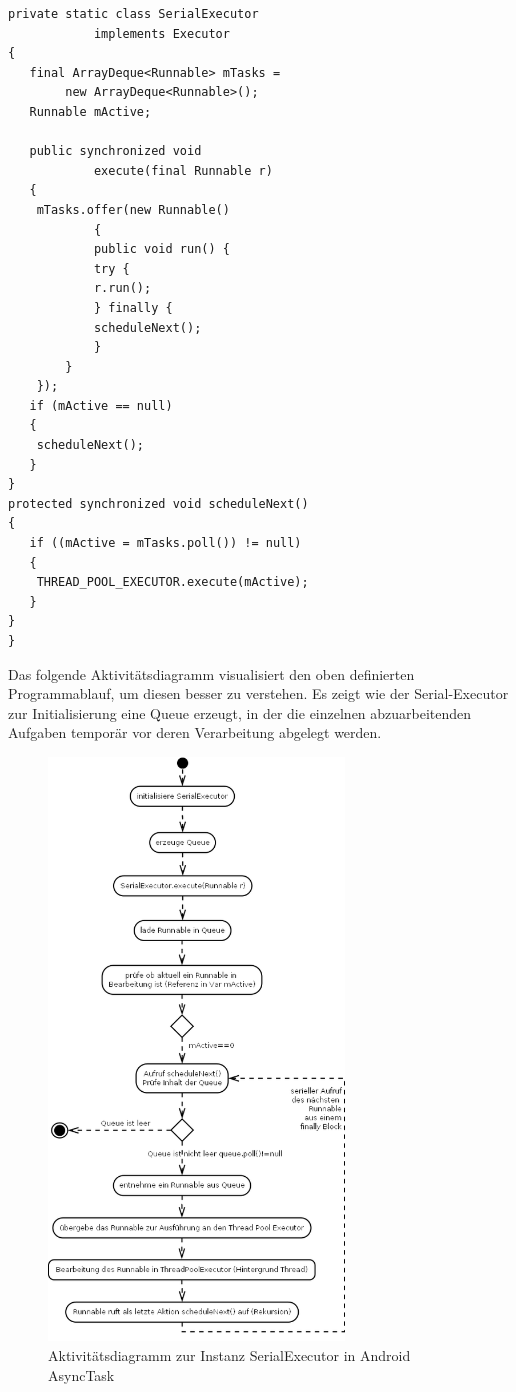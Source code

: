\documentclass[12pt,oneside,a4paper,bibtotoc,liststotoc]{scrreprt}
\begin{document}
\begin{lstlisting}
private static class SerialExecutor 
			implements Executor 
{
   final ArrayDeque<Runnable> mTasks = 
   		new ArrayDeque<Runnable>();
   Runnable mActive;

   public synchronized void 
   			execute(final Runnable r) 
   {
    mTasks.offer(new Runnable() 
    		{
   			public void run() {
			try {
			r.run();
			} finally {
			scheduleNext();
   			}
   		}
	});
   if (mActive == null) 
   {
   	scheduleNext();
   }
}
protected synchronized void scheduleNext() 
{
   if ((mActive = mTasks.poll()) != null) 
   {
   	THREAD_POOL_EXECUTOR.execute(mActive);
   }
}
}
\end{lstlisting}
Das folgende Aktivitätsdiagramm visualisiert den oben definierten Programmablauf, um diesen besser zu verstehen. Es zeigt wie der Serial-Executor zur Initialisierung eine Queue erzeugt, in der die einzelnen abzuarbeitenden Aufgaben temporär vor deren Verarbeitung abgelegt werden.
\begin{figure}[H]
  \begin{centering}
    \includegraphics[width=0.7\textwidth]{img/ActivitydiagrammAsyncTaskSerialExecutor.png}
    \caption{Aktivitätsdiagramm zur Instanz SerialExecutor in Android AsyncTask}
    \label{ActivitydiagrammAsyncTaskSerialExecutor}
  \end{centering}
\end{figure}
\end{document}
